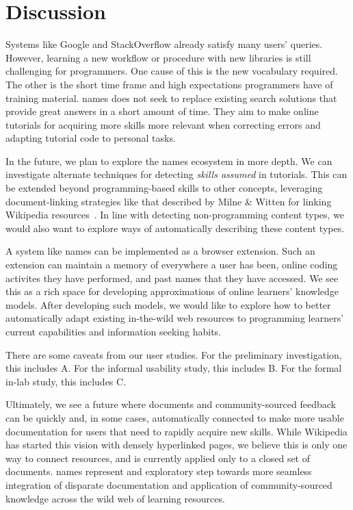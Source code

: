 \section{Discussion}

Systems like Google and StackOverflow already satisfy many users' queries.
However, learning a new workflow or procedure with new libraries is still challenging for programmers.
One cause of this is the new vocabulary required.
The other is the short time frame and high expectations programmers have of training material.
\Glspl{name} does not seek to replace existing search solutions that provide great answers in a short amount of time.
They aim to make online tutorials for acquiring more skills more relevant when correcting errors and adapting tutorial code to personal tasks.

In the future, we plan to explore the \Glspl{name} ecosystem in more depth.
We can investigate alternate techniques for detecting \emph{skills assumed} in tutorials.
This can be extended beyond programming-based skills to other concepts, leveraging document-linking strategies like that described by Milne \& Witten for linking Wikipedia resources~\cite{milne_learning_2008}.
In line with detecting non-programming content types, we would also want to explore ways of automatically describing these content types.

A system like \Glspl{name} can be implemented as a browser extension.
Such an extension can maintain a memory of everywhere a user has been, online coding activites they have performed, and past \glspl{name} that they have accessed.
We see this as a rich space for developing approximations of online learners' knowledge models.
After developing such models, we would like to explore how to better automatically adapt existing in-the-wild web resources to programming learners' current capabilities and information seeking habits.

There are some caveats from our user studies.
For the preliminary investigation, this includes A.
For the informal usability study, this includes B.
For the formal in-lab study, this includes C.

Ultimately, we see a future where documents and community-sourced feedback can be quickly and, in some cases, automatically connected to make more usable documentation for users that need to rapidly acquire new skills.
While Wikipedia has started this vision with densely hyperlinked pages, we believe this is only one way to connect resources, and is currently applied only to a closed set of documents.
\Glspl{name} represent and exploratory step towards more seamless integration of disparate documentation and application of community-sourced knowledge across the wild web of learning resources.
